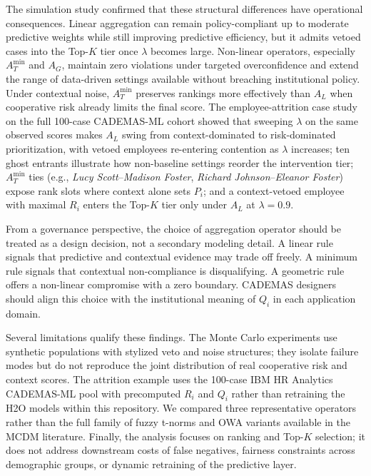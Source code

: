 \documentclass[mathematics,article,submit,moreauthors]{Definitions/mdpi}
\begin{document}
The simulation study confirmed that these structural differences have operational consequences. Linear aggregation can remain policy-compliant up to moderate predictive weights while still improving predictive efficiency, but it admits vetoed cases into the Top-$K$ tier once $\lambda$ becomes large. Non-linear operators, especially $A_T^{\min}$ and $A_G$, maintain zero violations under targeted overconfidence and extend the range of data-driven settings available without breaching institutional policy. Under contextual noise, $A_T^{\min}$ preserves rankings more effectively than $A_L$ when cooperative risk already limits the final score. The employee-attrition case study on the full 100-case CADEMAS-ML cohort showed that sweeping $\lambda$ on the same observed scores makes $A_L$ swing from context-dominated to risk-dominated prioritization, with vetoed employees re-entering contention as $\lambda$ increases; ten ghost entrants illustrate how non-baseline settings reorder the intervention tier; $A_T^{\min}$ ties (e.g., \textit{Lucy Scott}--\textit{Madison Foster}, \textit{Richard Johnson}--\textit{Eleanor Foster}) expose rank slots where context alone sets $P_i$; and a context-vetoed employee with maximal $R_i$ enters the Top-$K$ tier only under $A_L$ at $\lambda = 0.9$.

From a governance perspective, the choice of aggregation operator should be treated as a design decision, not a secondary modeling detail. A linear rule signals that predictive and contextual evidence may trade off freely. A minimum rule signals that contextual non-compliance is disqualifying. A geometric rule offers a non-linear compromise with a zero boundary. CADEMAS designers should align this choice with the institutional meaning of $Q_i$ in each application domain.

Several limitations qualify these findings. The Monte Carlo experiments use synthetic populations with stylized veto and noise structures; they isolate failure modes but do not reproduce the joint distribution of real cooperative risk and context scores. The attrition example uses the 100-case IBM HR Analytics CADEMAS-ML pool with precomputed $R_i$ and $Q_i$ rather than retraining the H2O models within this repository. We compared three representative operators rather than the full family of fuzzy t-norms and OWA variants available in the MCDM literature. Finally, the analysis focuses on ranking and Top-$K$ selection; it does not address downstream costs of false negatives, fairness constraints across demographic groups, or dynamic retraining of the predictive layer.
\end{document}
